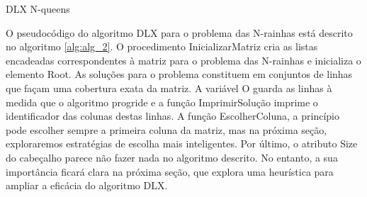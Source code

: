 \documentclass{article}
\begin{document}
\begin{algorithm}
\begin{algorithmic}[1]
 
 

    \EndFor
  \EndFor
\EndProcedure


    \EndFor
  \EndFor
\EndProcedure

    \EndFor
  \EndFor

\EndProcedure

    \Return
  \EndIf
  
  
    \EndFor


    \EndFor
  \EndFor
\EndProcedure

\EndProcedure

\end{algorithmic}
\caption{DLX N-queens}\label{alg:alg_2}
\end{algorithm}

O pseudocódigo do algoritmo DLX para o problema das N-rainhas está descrito no algoritmo \ref{alg:alg_2}.
O procedimento InicializarMatriz cria as listas encadeadas correspondentes à matriz para o problema das N-rainhas
e inicializa o elemento Root. As soluções para o problema constituem em conjuntos de linhas que façam uma cobertura
exata da matriz. A variável O guarda as linhas à medida que o algoritmo progride e a função ImprimirSolução imprime
o identificador das colunas destas linhas. A função EscolherColuna, a princípio pode escolher sempre a primeira coluna 
da matriz, mas na próxima seção, exploraremos estratégias de escolha mais inteligentes. Por último, o atributo Size do 
cabeçalho parece não fazer nada no algoritmo descrito. No entanto, a sua importância ficará clara
na próxima seção, que explora uma heurística para ampliar a eficácia do algoritmo DLX.
\end{document}
